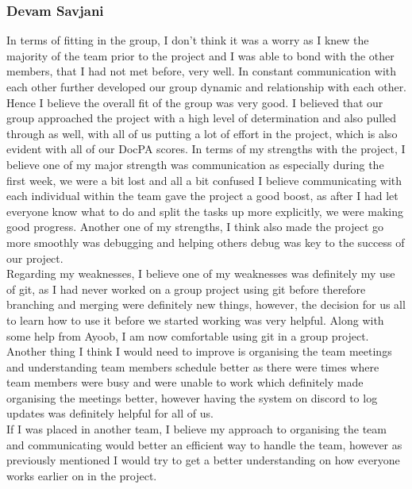 \documentclass[11pt]{article}
\begin{document}
\subsubsection{Devam Savjani}
In terms of fitting in the group, I don’t think it was a worry as I knew the majority of the team prior to the project and I was able to bond with the other members, that I had not met before, very well. In constant communication with each other further developed our group dynamic and relationship with each other. Hence I believe the overall fit of the group was very good. I believed that our group approached the project with a high level of determination and also pulled through as well, with all of us putting a lot of effort in the project, which is also evident with all of our DocPA scores.
In terms of my strengths with the project, I believe one of my major strength was communication as especially during the first week, we were a bit lost and all a bit confused I believe communicating with each individual within the team gave the project a good boost, as after I had let everyone know what to do and split the tasks up more explicitly, we were making good progress. Another one of my strengths, I think also made the project go more smoothly was debugging and helping others debug was key to the success of our project.
\\Regarding my weaknesses, I believe one of my weaknesses was definitely my use of git, as I had never worked on a group project using git before therefore branching and merging were definitely new things, however, the decision for us all to learn how to use it before we started working was very helpful. Along with some help from Ayoob, I am now comfortable using git in a group project.
\\Another thing I think I would need to improve is organising the team meetings and understanding team members schedule better as there were times where team members were busy and were unable to work which definitely made organising the meetings better, however having the system on discord to log updates was definitely helpful for all of us.
\\If I was placed in another team, I believe my approach to organising the team and communicating would better an efficient way to handle the team, however as previously mentioned I would try to get a better understanding on how everyone works earlier on in the project.
\end{document}
